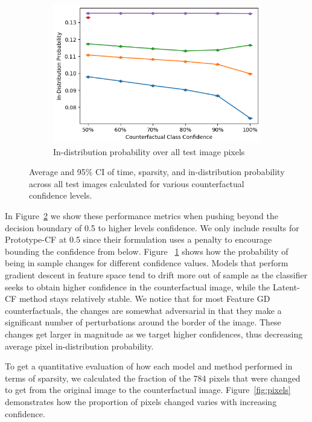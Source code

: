 \documentclass[letterpaper]{article} %
\begin{document}
\begin{figure}[hbt!]
    \begin{subfigure}{0.5\textwidth}
        \centering
        \includegraphics[width=0.9\linewidth]{figures/mnist/kde.png}
        \caption{In-distribution probability over all test image pixels}
        \label{fig:kde_confidences}
    \end{subfigure}
    \caption{Average and 95\% CI of time, sparsity, and in-distribution probability across all test images calculated for various counterfactual confidence levels.} %
    \label{fig:confidences}
\end{figure}

In Figure~\ref{fig:confidences} we show these performance metrics when pushing beyond the decision boundary of 0.5 to higher levels confidence. We only include results for Prototype-CF at 0.5 since their formulation uses a penalty to encourage bounding the confidence from below. Figure ~\ref{fig:kde_confidences} shows how the probability of being in sample changes for different confidence values. Models that perform gradient descent in feature space tend to drift more out of sample as the classifier seeks to obtain higher confidence in the counterfactual image, while the Latent-CF method stays relatively stable. We notice that for most Feature GD counterfactuals, the changes are somewhat adversarial in that they make a significant number of perturbations around the border of the image. These changes get larger in magnitude as we target higher confidences, thus decreasing average pixel in-distribution probability. 

To get a quantitative evaluation of how each model and method performed in terms of sparsity, we calculated the fraction of the 784 pixels that were changed to get from the original image to the counterfactual image. Figure~\ref{fig:pixels} demonstrates how the proportion of pixels changed varies with increasing confidence.
\end{document}
